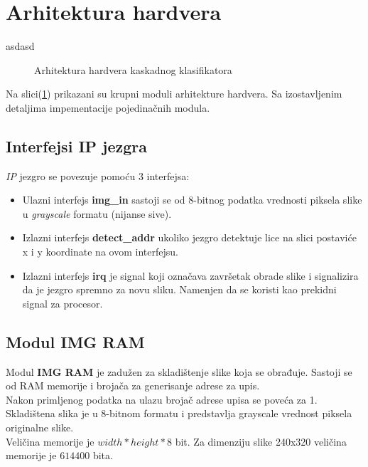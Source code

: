 \section{Arhitektura hardvera}
asdasd

\begin{figure}[H]
\centering{
  \scalebox{0.8}{
    
  }}
\caption{Arhitektura hardvera kaskadnog klasifikatora}
\label{hw_arch_top}
\end{figure}

Na slici(\ref{hw_arch_top}) prikazani su krupni moduli arhitekture hardvera.
Sa izostavljenim detaljima impementacije pojedinačnih modula. \\

\subsection{Interfejsi IP jezgra}
\emph{IP} jezgro se povezuje pomoću 3 interfejsa:

\begin{itemize}
  \item Ulazni interfejs \textbf{img\_in} sastoji se od 8-bitnog podatka
    vrednosti piksela slike u \emph{grayscale} formatu (nijanse sive).
  \item Izlazni interfejs \textbf{detect\_addr} ukoliko jezgro detektuje lice na slici
    postaviće x i y koordinate na ovom interfejsu.
  \item Izlazni interfejs \textbf{irq} je signal koji označava završetak obrade slike i
    signalizira da je jezgro spremno za novu sliku.
    Namenjen da se koristi kao prekidni signal za procesor.
\end{itemize}

\subsection{Modul IMG RAM}

Modul \textbf{IMG RAM} je zadužen za skladištenje slike koja se obrađuje.
Sastoji se od RAM memorije i brojača za generisanje adrese za upis. \\
Nakon primljenog podatka na ulazu brojač adrese upisa se poveća za 1. \\
Skladištena slika je u 8-bitnom formatu i predstavlja grayscale vrednost piksela
originalne slike. \\
Veličina memorije je $width*height*8$ bit. Za dimenziju slike 240x320
veličina memorije je $614400$ bita. \\

